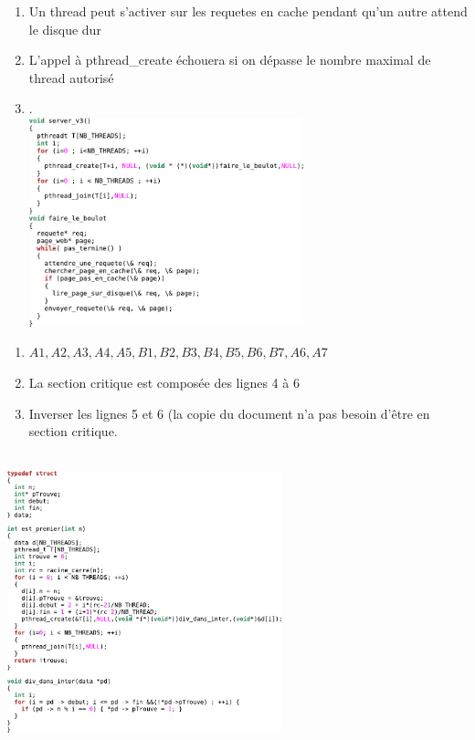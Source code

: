 \begin{enumerate}
	\item Un thread peut s'activer sur les requetes en cache pendant qu'un autre attend le disque dur
	\item L'appel à pthread\_create échouera si on dépasse le nombre maximal de thread autorisé
	\item  .\\ \includegraphics[width=300px]{fig10.pdf}

\end{enumerate}

\begin{enumerate}
	\item $A1, A2, A3, A4, A5, B1, B2, B3, B4, B5, B6, B7, A6, A7$
	\item La section critique est composée des lignes 4 à 6
	\item Inverser les lignes 5 et 6 (la copie du document n'a pas besoin d'être en section critique.
\end{enumerate}

 \\
\includegraphics[width=300px]{fig11.pdf}
